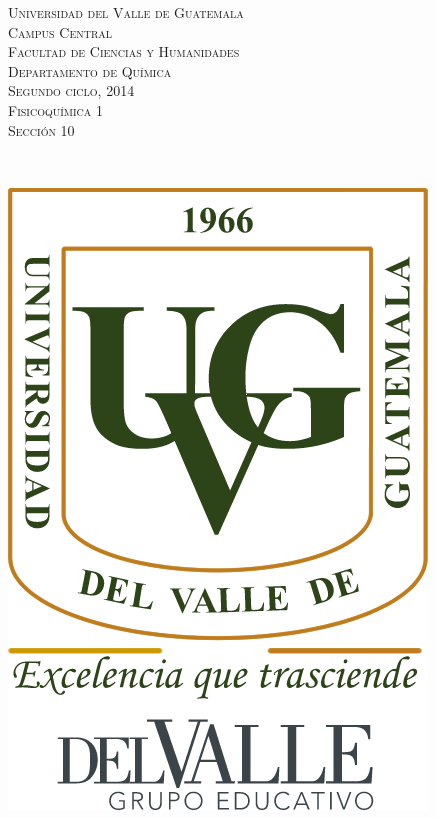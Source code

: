 \documentclass[a4paper,12pt]{article}
\begin{document}
\newcommand{\HRule}{\rule{\linewidth}{0.4mm}} %


\begin{minipage}{0.7\textwidth}
\begin{flushleft} 
\textsc{Universidad del Valle de Guatemala \\
Campus Central \\
Facultad de Ciencias y Humanidades \\
Departamento de Qu\'imica \\
Segundo ciclo, 2014 \\
Fisicoqu\'imica 1 \\
Secci\'on 10 \\
}
\end{flushleft}
\end{minipage}
~
\begin{minipage}{0.2\textwidth}
\begin{flushright}
\includegraphics[scale=0.3]{Logo_UVG} %
\end{flushright}
\end{minipage}\\
\end{document}

